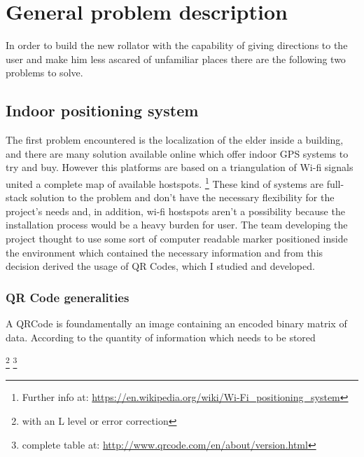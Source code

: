 \chapter{General problem description}

In order to build the new rollator with the capability of giving directions to
the user and make him less ascared of unfamiliar places there are the following
two problems to solve.

\section{Indoor positioning system}
The first problem encountered is the localization of the elder inside a
building, and there are many solution available online which offer indoor 
GPS systems to try and buy.
However this platforms are based on a triangulation of Wi-fi signals united a
complete map of available hostspots.
\footnote{Further info at: 
\url{https://en.wikipedia.org/wiki/Wi-Fi_positioning_system}}
These kind of systems are full-stack solution to the problem and don't have the
necessary flexibility for the project's needs and, in addition, wi-fi hostspots 
aren't a possibility because the installation process would be a heavy burden
for user.
\newline
The team developing the project thought to use some sort of computer readable 
marker positioned inside the environment which contained the necessary information
and from this decision derived the usage of QR Codes, which I studied and
developed.

\newpage
\subsection{QR Code generalities}
A QRCode is foundamentally an image containing an encoded binary matrix of data.
According to the quantity of information which needs to be stored 

\footnote{with an L level or error correction}
\footnote{complete table at: \url{http://www.qrcode.com/en/about/version.html}}    














  
